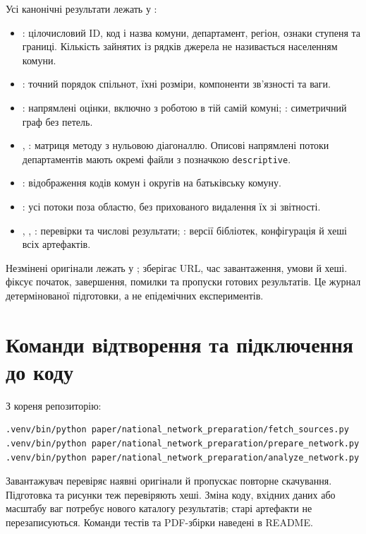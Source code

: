 \documentclass[11pt,a4paper]{article}
\begin{document}
Усі канонічні результати лежать у :
\begin{itemize}
\item {}: цілочисловий ID, код і назва комуни, департамент, регіон, ознаки ступеня та границі. Кількість зайнятих із рядків джерела не називається населенням комуни.
\item {}: точний порядок спільнот, їхні розміри, компоненти зв'язності та ваги.
\item {}: напрямлені оцінки, включно з роботою в тій самій комуні; : симетричний граф без петель.
\item {}, : матриця методу з нульовою діагоналлю. Описові напрямлені потоки департаментів мають окремі файли з позначкою \texttt{descriptive}.
\item {}: відображення кодів комун і округів на батьківську комуну.
\item {}: усі потоки поза областю, без прихованого видалення їх зі звітності.
\item {}, , : перевірки та числові результати; : версії бібліотек, конфігурація й хеші всіх артефактів.
\end{itemize}
Незмінені оригінали лежать у ;  зберігає URL, час завантаження, умови й хеші.  фіксує початок, завершення, помилки та пропуски готових результатів. Це журнал детермінованої підготовки, а не епідемічних експериментів.

\section{Команди відтворення та підключення до коду}
З кореня репозиторію:
\begin{verbatim}
.venv/bin/python paper/national_network_preparation/fetch_sources.py
.venv/bin/python paper/national_network_preparation/prepare_network.py
.venv/bin/python paper/national_network_preparation/analyze_network.py
\end{verbatim}
Завантажувач перевіряє наявні оригінали й пропускає повторне скачування. Підготовка та рисунки теж перевіряють хеші. Зміна коду, вхідних даних або масштабу ваг потребує нового каталогу результатів; старі артефакти не перезаписуються. Команди тестів та PDF-збірки наведені в README.
\end{document}
